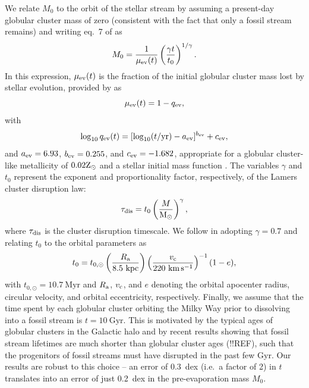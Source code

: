 \documentclass[twocolumn]{aastex63}
\newcommand{\msun}{\ensuremath{\textrm{M}_\odot}}
\newcommand{\myr}{\ensuremath{\textrm{Myr}}}
\newcommand{\gyr}{\ensuremath{\textrm{Gyr}}}
\newcommand{\kpc}{\ensuremath{\textrm{kpc}}}
\newcommand{\kms}{\ensuremath{\textrm{km}\,\textrm{s}^{-1}}}
\begin{document}
We relate $M_0$ to the orbit of the stellar stream by assuming a present-day globular cluster mass of zero (consistent with the fact that only a fossil stream remains) and writing eq.~7 of \citet{lamers05} as
\begin{equation}
\label{eq:m0}
M_{\rm 0}=\frac{1}{\mu_{\rm ev}(t)}\left(\frac{\gamma t}{t_0}\right)^{1/\gamma} .
\end{equation}
In this expression, $\mu_{\rm ev}(t)$ is the fraction of the initial globular cluster mass lost by stellar evolution, provided by \citet{lamers05} as
\begin{equation}
\label{eq:muev}
\mu_{\rm ev}(t)=1-q_{\rm ev} ,
\end{equation}
with
\begin{equation}
\label{eq:qev}
\log_{10}{q_{\rm ev}}(t) = [\log_{10}(t/{\rm yr})-a_{\rm ev}]^{b_{\rm ev}}+c_{\rm ev} ,
\end{equation}
and $a_{\rm ev} = 6.93$, $b_{\rm ev} = 0.255$, and $c_{\rm ev} = -1.682$, appropriate for a globular cluster-like metallicity of $0.02{\rm Z}_\odot$ and a \citet{kroupa01} stellar initial mass function \citep{kruijssen08}. The variables $\gamma$ and $t_0$ represent the exponent and proportionality factor, respectively, of the Lamers cluster disruption law:
\begin{equation}
\label{eq:lamers}
\tau_{\rm dis}=t_0\left(\frac{M}{\msun}\right)^\gamma ,
\end{equation}
where $\tau_{\rm dis}$ is the cluster disruption timescale. We follow \citet{kruijssen09} in adopting $\gamma=0.7$ and relating $t_0$ to the orbital parameters as
\begin{equation}
\label{eq:t0}
t_0 = t_{0,\odot}\left(\frac{R_{\rm a}}{8.5~\kpc}\right)\left(\frac{v_{\rm c}}{220~\kms}\right)^{-1}(1-e) ,
\end{equation}
with $t_{0,\odot}=10.7~\myr$ and $R_{\rm a}$, $v_{\rm c}$, and $e$ denoting the orbital apocenter radius, circular velocity, and orbital eccentricity, respectively. Finally, we assume that the time spent by each globular cluster orbiting the Milky Way prior to dissolving into a fossil stream is $t=10~\gyr$. This is motivated by the typical ages of globular clusters in the Galactic halo \citep[$\sim12~\gyr$, e.g.][]{kruijssen19e} and by recent results showing that fossil stream lifetimes are much shorter than globular cluster ages (!!REF), such that the progenitors of fossil streams must have disrupted in the past few Gyr. Our results are robust to this choice -- an error of 0.3~dex (i.e.\ a factor of 2) in $t$ translates into an error of just 0.2~dex in the pre-evaporation mass $M_0$.
\end{document}
